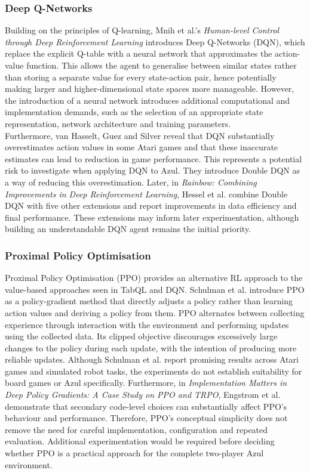 \subsubsection{Deep Q-Networks}
Building on the principles of Q-learning, Mnih et al.'s \emph{Human-level Control through Deep Reinforcement Learning} \cite{dqn} introduces Deep Q-Networks (DQN), which replace the explicit Q-table with a neural network that approximates the action-value function. This allows the agent to generalise between similar states rather than storing a separate value for every state-action pair, hence potentially making larger and higher-dimensional state spaces more manageable. However, the introduction of a neural network introduces additional computational and implementation demands, such as the selection of an appropriate state representation, network architecture and training parameters. \\

Furthermore, van Hasselt, Guez and Silver \cite{doubledqn} reveal that DQN substantially overestimates action values in some Atari games and that these inaccurate estimates can lead to reduction in game performance. This represents a potential risk to investigate when applying DQN to Azul. They introduce Double DQN as a way of reducing this overestimation. Later, in \emph{Rainbow: Combining Improvements in Deep Reinforcement Learning}, Hessel et al. \cite{dqnimprovements} combine Double DQN with five other extensions and report improvements in data efficiency and final performance. These extensions may inform later experimentation, although building an understandable DQN agent remains the initial priority.

\subsubsection{Proximal Policy Optimisation}
Proximal Policy Optimisation (PPO) provides an alternative RL approach to the value-based approaches seen in TabQL and DQN. Schulman et al. \cite{ppo} introduce PPO as a policy-gradient method that directly adjusts a policy rather than learning action values and deriving a policy from them. PPO alternates between collecting experience through interaction with the environment and performing updates using the collected data. Its clipped objective discourages excessively large changes to the policy during each update, with the intention of producing more reliable updates. Although Schulman et al. report promising results across Atari games and simulated robot tasks, the experiments do not establish suitability for board games or Azul specifically. Furthermore, in \emph{Implementation Matters in Deep Policy Gradients: A Case Study on PPO and TRPO}, Engstrom et al. \cite{ppoweakness} demonstrate that secondary code-level choices can substantially affect PPO's behaviour and performance. Therefore, PPO's conceptual simplicity does not remove the need for careful implementation, configuration and repeated evaluation. Additional experimentation would be required before deciding whether PPO is a practical approach for the complete two-player Azul environment.


